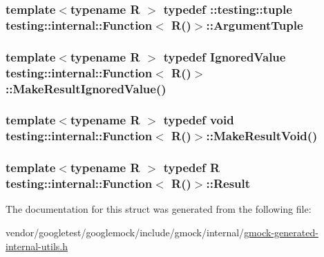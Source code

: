 \subsubsection[{\texorpdfstring{Argument\+Tuple}{ArgumentTuple}}]{\setlength{\rightskip}{0pt plus 5cm}template$<$typename R $>$ typedef \+::testing\+::tuple {\bf testing\+::internal\+::\+Function}$<$ R()$>$\+::{\bf Argument\+Tuple}}\hypertarget{structtesting_1_1internal_1_1Function_3_01R_07_08_4_ad483c3128c470d8cdb55c3ac1c575c11}{}\label{structtesting_1_1internal_1_1Function_3_01R_07_08_4_ad483c3128c470d8cdb55c3ac1c575c11}
\subsubsection[{\texorpdfstring{Make\+Result\+Ignored\+Value}{MakeResultIgnoredValue}}]{\setlength{\rightskip}{0pt plus 5cm}template$<$typename R $>$ typedef {\bf Ignored\+Value} {\bf testing\+::internal\+::\+Function}$<$ R()$>$\+::Make\+Result\+Ignored\+Value()}\hypertarget{structtesting_1_1internal_1_1Function_3_01R_07_08_4_aa459093a5b52ef54e2544b5a6c054383}{}\label{structtesting_1_1internal_1_1Function_3_01R_07_08_4_aa459093a5b52ef54e2544b5a6c054383}
\subsubsection[{\texorpdfstring{Make\+Result\+Void}{MakeResultVoid}}]{\setlength{\rightskip}{0pt plus 5cm}template$<$typename R $>$ typedef void {\bf testing\+::internal\+::\+Function}$<$ R()$>$\+::Make\+Result\+Void()}\hypertarget{structtesting_1_1internal_1_1Function_3_01R_07_08_4_a666b5ad3bf155529d3a0f9fe6d5c897b}{}\label{structtesting_1_1internal_1_1Function_3_01R_07_08_4_a666b5ad3bf155529d3a0f9fe6d5c897b}
\subsubsection[{\texorpdfstring{Result}{Result}}]{\setlength{\rightskip}{0pt plus 5cm}template$<$typename R $>$ typedef R {\bf testing\+::internal\+::\+Function}$<$ R()$>$\+::{\bf Result}}\hypertarget{structtesting_1_1internal_1_1Function_3_01R_07_08_4_a5c228a886ef598ac10988f8de5e32ca1}{}\label{structtesting_1_1internal_1_1Function_3_01R_07_08_4_a5c228a886ef598ac10988f8de5e32ca1}


The documentation for this struct was generated from the following file\+:\begin{DoxyCompactItemize}
\item 
vendor/googletest/googlemock/include/gmock/internal/\hyperlink{gmock-generated-internal-utils_8h}{gmock-\/generated-\/internal-\/utils.\+h}\end{DoxyCompactItemize}
